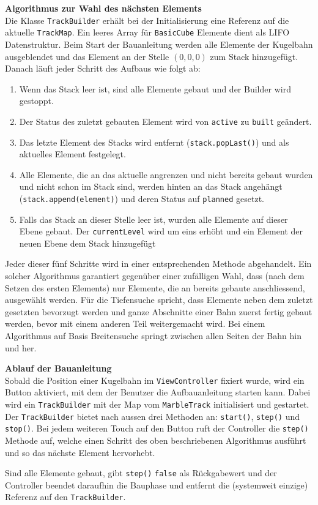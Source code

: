 \begin{description}
	\textbf{Algorithmus zur Wahl des nächsten Elements}\\
	Die Klasse \texttt{TrackBuilder} erhält bei der Initialisierung eine Referenz auf die aktuelle \texttt{TrackMap}. Ein leeres Array für \texttt{BasicCube} Elemente dient als LIFO Datenstruktur. Beim Start der Bauanleitung werden alle Elemente der Kugelbahn ausgeblendet und das Element an der Stelle $(0,0,0)$ zum Stack hinzugefügt. Danach läuft jeder Schritt des Aufbaus wie folgt ab:
	\begin{enumerate}
		\item Wenn das Stack leer ist, sind alle Elemente gebaut und der Builder wird gestoppt.
		\item Der Status des zuletzt gebauten Element wird von \texttt{active} zu \texttt{built} geändert.
		\item Das letzte Element des Stacks wird entfernt (\texttt{stack.popLast()}) und als aktuelles Element festgelegt.
		\item Alle Elemente, die an das aktuelle angrenzen und nicht bereits gebaut wurden und nicht schon im Stack sind, werden hinten an das Stack angehängt (\texttt{stack.append(element)}) und deren Status auf \texttt{planned} gesetzt.
		\item Falls das Stack an dieser Stelle leer ist, wurden alle Elemente auf dieser Ebene gebaut. Der \texttt{currentLevel} wird um eins erhöht und ein Element der neuen Ebene dem Stack hinzugefügt
	\end{enumerate}

	Jeder dieser fünf Schritte wird in einer entsprechenden Methode abgehandelt. Ein solcher Algorithmus garantiert gegenüber einer zufälligen Wahl, dass (nach dem Setzen des ersten Elements) nur Elemente, die an bereits gebaute anschliessend, ausgewählt werden. Für die Tiefensuche spricht, dass Elemente neben dem zuletzt gesetzten bevorzugt werden und ganze Abschnitte einer Bahn zuerst fertig gebaut werden, bevor mit einem anderen Teil weitergemacht wird. Bei einem Algorithmus auf Basis Breitensuche springt zwischen allen Seiten der Bahn hin und her.

	\textbf{Ablauf der Bauanleitung}\\
	Sobald die Position einer Kugelbahn im \texttt{ViewController} fixiert wurde, wird ein Button aktiviert, mit dem der Benutzer die Aufbauanleitung starten kann. Dabei wird ein \texttt{TrackBuilder} mit der Map vom \texttt{MarbleTrack} initialisiert und gestartet. Der \texttt{TrackBuilder} bietet nach aussen drei Methoden an: \texttt{start()}, \texttt{step()} und \texttt{stop()}. Bei jedem weiteren Touch auf den Button ruft der Controller die \texttt{step()} Methode auf, welche einen Schritt des oben beschriebenen Algorithmus ausführt und so das nächste Element hervorhebt.

	Sind alle Elemente gebaut, gibt \texttt{step()} \texttt{false} als Rückgabewert und der Controller beendet daraufhin die Bauphase und entfernt die (systemweit einzige) Referenz auf den \texttt{TrackBuilder}.
\end{description}
